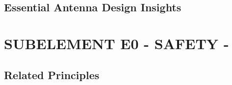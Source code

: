\documentclass[12pt]{book}
\begin{document}
\section{Essential Antenna Design Insights}











\chapter{SUBELEMENT E0 - SAFETY -}
\section{Related Principles}












\end{document}
